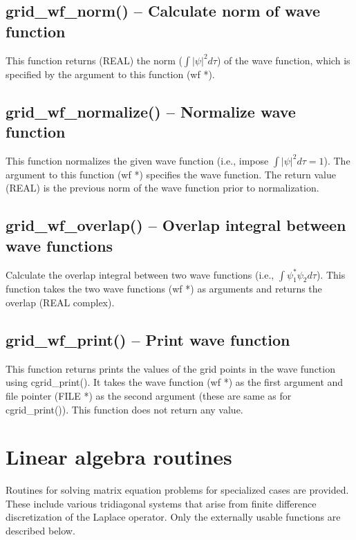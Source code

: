 \documentclass[12pt,letterpaper]{report}
\begin{document}
\subsection{grid\_wf\_norm() -- Calculate norm of wave function}

This function returns (REAL) the norm ($\int|\psi|^2d\tau$) of the wave function, which is specified by the argument to this function (wf *).

\subsection{grid\_wf\_normalize() -- Normalize wave function}

This function normalizes the given wave function (i.e., impose $\int|\psi|^2d\tau = 1$). The argument to this function (wf *) specifies the wave function. The return value (REAL) is the previous norm of the wave function prior to normalization.

\subsection{grid\_wf\_overlap() -- Overlap integral between wave functions}

Calculate the overlap integral between two wave functions (i.e., $\int \psi_1^*\psi_2d\tau$). This function takes the two wave functions (wf *) as arguments and returns the overlap (REAL complex).

\subsection{grid\_wf\_print() -- Print wave function}

This function returns prints the values of the grid points in the wave function using cgrid\_print(). It takes the wave function (wf *) as the first argument and file pointer (FILE *) as the second argument (these are same as for cgrid\_print()). This function does not return any value.

\section{Linear algebra routines}

Routines for solving matrix equation problems for specialized cases are provided. These include various tridiagonal systems that arise from finite difference discretization of the Laplace operator. Only the externally usable functions are described below.
\end{document}
